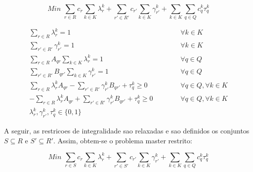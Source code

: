 \documentclass[12pt]{article}
\begin{document}
\[
Min \,\, \sum\limits_{r \in R} {c_r \sum\limits_{k \in K}{\lambda^k_r}} + \sum\limits_{r' \in R'} {c_{r'} \sum\limits_{k \in K}{\gamma^k_{r'}}} + \sum\limits_{k \in K} {\sum\limits_{q \in Q} {c^k_q \tau^k_q}}
\]

\begin{eqnarray}
\label{eqA01}
  \sum\limits_{r \in R} {\lambda^k_r} = 1   & \hspace{1cm} & \forall k \in K \\
\label{eqA02}
  \sum\limits_{r' \in R'} {\gamma^k_{r'}} = 1 & \hspace{1cm} & \forall k \in K \\
\label{eqA03}
  \sum\limits_{r \in R} {A_{qr} \sum\limits_{k \in K}{\lambda^k_r}} = 1 & \hspace{1cm} & \forall q \in Q \\
\label{eqA04}
  \sum\limits_{r' \in R'} {B_{qr'} \sum\limits_{k \in K}{\gamma^k_{r'}}} = 1 & \hspace{1cm} & \forall q \in Q \\
\label{eqA05}
  \sum\limits_{r \in R} {\lambda^k_r A_{qr}} - \sum\limits_{r' \in R'} {\gamma^k_{r'} B_{qr'}} + \tau^k_q \ge 0 & \hspace{1cm} & \forall q \in Q, \forall k \in K \\
\label{eqA06}
  -\sum\limits_{r \in R} {\lambda^k_r A_{qr}} + \sum\limits_{r' \in R'} {\gamma^k_{r'} B_{qr'}} + \tau^k_q \ge 0 & \hspace{1cm} & \forall q \in Q, \forall k \in K \\
\label{eqA07}
  \lambda^k_r, \gamma^k_{r'}, \tau^k_q \in \{0,1\} 
\end{eqnarray}

\vspace{2.5cm}
\noindent A seguir, as restricoes de integralidade sao relaxadas e sao definidos os conjuntos $S \subseteq R$ e $S' \subseteq R'$. Assim, obtem-se o problema master restrito:

\[
Min \,\, \sum\limits_{r \in S} {c_r \sum\limits_{k \in K}{\lambda^k_r}} + \sum\limits_{r' \in S'} {c_{r'} \sum\limits_{k \in K}{\gamma^k_{r'}}} + \sum\limits_{k \in K} {\sum\limits_{q \in Q} {c^k_q \tau^k_q}}
\]
\end{document}
